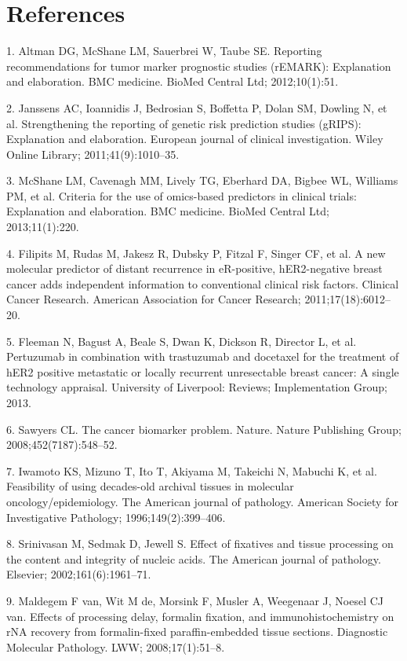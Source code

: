 \documentclass[11pt]{article}
\begin{document}
\section{References}\label{references}

\setlength{\parindent}{0pt}

1. Altman DG, McShane LM, Sauerbrei W, Taube SE. Reporting
recommendations for tumor marker prognostic studies (rEMARK):
Explanation and elaboration. BMC medicine. BioMed Central Ltd;
2012;10(1):51.

2. Janssens AC, Ioannidis J, Bedrosian S, Boffetta P, Dolan SM, Dowling
N, et al. Strengthening the reporting of genetic risk prediction studies
(gRIPS): Explanation and elaboration. European journal of clinical
investigation. Wiley Online Library; 2011;41(9):1010--35.

3. McShane LM, Cavenagh MM, Lively TG, Eberhard DA, Bigbee WL, Williams
PM, et al. Criteria for the use of omics-based predictors in clinical
trials: Explanation and elaboration. BMC medicine. BioMed Central Ltd;
2013;11(1):220.

4. Filipits M, Rudas M, Jakesz R, Dubsky P, Fitzal F, Singer CF, et al.
A new molecular predictor of distant recurrence in eR-positive,
hER2-negative breast cancer adds independent information to conventional
clinical risk factors. Clinical Cancer Research. American Association
for Cancer Research; 2011;17(18):6012--20.

5. Fleeman N, Bagust A, Beale S, Dwan K, Dickson R, Director L, et al.
Pertuzumab in combination with trastuzumab and docetaxel for the
treatment of hER2 positive metastatic or locally recurrent unresectable
breast cancer: A single technology appraisal. University of Liverpool:
Reviews; Implementation Group; 2013.

6. Sawyers CL. The cancer biomarker problem. Nature. Nature Publishing
Group; 2008;452(7187):548--52.

7. Iwamoto KS, Mizuno T, Ito T, Akiyama M, Takeichi N, Mabuchi K, et al.
Feasibility of using decades-old archival tissues in molecular
oncology/epidemiology. The American journal of pathology. American
Society for Investigative Pathology; 1996;149(2):399--406.

8. Srinivasan M, Sedmak D, Jewell S. Effect of fixatives and tissue
processing on the content and integrity of nucleic acids. The American
journal of pathology. Elsevier; 2002;161(6):1961--71.

9. Maldegem F van, Wit M de, Morsink F, Musler A, Weegenaar J, Noesel CJ
van. Effects of processing delay, formalin fixation, and
immunohistochemistry on rNA recovery from formalin-fixed
paraffin-embedded tissue sections. Diagnostic Molecular Pathology. LWW;
2008;17(1):51--8.
\end{document}
